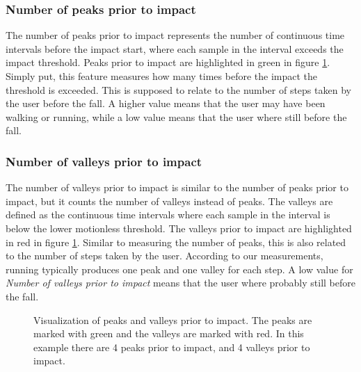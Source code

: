 \documentclass[12pt, a4paper, onecolumn]{article}
\begin{document}
	\subsubsection{Number of peaks prior to impact}
	
	The number of peaks prior to impact represents the number of continuous time intervals before the impact start, where each sample in the interval exceeds the impact threshold. Peaks prior to impact are highlighted in green in figure \ref{fig:fall-data-peaks-and-valleys}. Simply put, this feature measures how many times before the impact the threshold is exceeded. This is supposed to relate to the number of steps taken by the user before the fall. A higher value means that the user may have been walking or running, while a low value means that the user where still before the fall.
	
	\subsubsection{Number of valleys prior to impact}
	
	The number of valleys prior to impact is similar to the number of peaks prior to impact, but it counts the number of valleys instead of peaks. The valleys are defined as the continuous time intervals where each sample in the interval is below the lower motionless threshold. The valleys prior to impact are highlighted in red in figure \ref{fig:fall-data-peaks-and-valleys}. Similar to measuring the number of peaks, this is also related to the number of steps taken by the user. According to our measurements, running typically produces one peak and one valley for each step. A low value for \textit{Number of valleys prior to impact} means that the user where probably still before the fall.
	
	\begin{figure}[H]
		\centering
		\caption{Visualization of peaks and valleys prior to impact. The peaks are marked with green and the valleys are marked with red. In this example there are 4 peaks prior to impact, and 4 valleys prior to impact.}%
		\label{fig:fall-data-peaks-and-valleys}%
	\end{figure}
	
\end{document}

